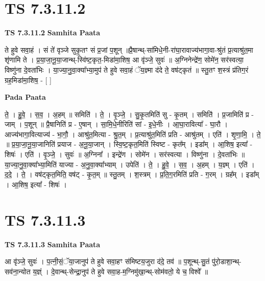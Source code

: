 \documentclass[17pt]{extarticle}
\begin{document}

\section{ TS 7.3.11.2 }

\textbf{TS 7.3.11.2 } \newline
\textbf{Samhita Paata} \newline

ते हुवे सवा॒हं । सं ते॑ वृञ्जे सुकृ॒तꣳ सं प्र॒जां प॒शून् ॥प्रै॒षान्थ्-सा॑मिधे॒नी-रा॑घा॒रावाज्य॑भागा॒वा-श्रु॑तं प्र॒त्याश्रु॑त॒मा शृ॑णामि ते । प्र॒या॒जा॒नू॒या॒जान्थ्-स्वि॑ष्ट॒कृत॒-मिडा॑मा॒शिष॒ आ वृ॑ञ्जे॒ सुवः॑ ॥ अ॒ग्निनेन्द्रे॑ण॒ सोमे॑न॒ सर॑स्वत्या॒ विष्णु॑ना दे॒वता॑भिः । या॒ज्या॒नु॒वा॒क्या᳚भ्या॒मुप॑ ते हुवे सवा॒हं ॅय॒ज्ञ्मा द॑दे ते॒ वष॑ट्कृतं ॥ स्तु॒तꣳ श॒स्त्रं प्र॑तिग॒रं ग्रह॒मिडा॑मा॒शिष॒ - [  ] \newline

\textbf{Pada Paata} \newline

ते॒ । हु॒वे॒ । स॒व॒ । अ॒हम् ॥ समिति॑ । ते॒ । वृ॒ञ्जे॒ । सु॒कृ॒तमिति॑ सु - कृ॒तम् । समिति॑ । प्र॒जामिति॑ प्र - जाम् । प॒शून् ॥ प्रै॒षानिति॑ प्र - ए॒षान् । सा॒मि॒धे॒नीरिति॑ सां - इ॒धे॒नीः । आ॒घा॒रावित्या᳚ - घा॒रौ । आज्य॑भागा॒वित्याज्य॑ - भा॒गौ॒ । आश्रु॑त॒मित्या - श्रु॒त॒म् । प्र॒त्याश्रु॑त॒मिति॑ प्रति - आश्रु॑तम् । एति॑ । शृ॒णा॒मि॒ । ते॒ ॥ प्र॒या॒जा॒नू॒या॒जानिति॑ प्रयाज - अ॒नू॒या॒जान् । स्वि॒ष्ट॒कृत॒मिति॑ स्विष्ट - कृत᳚म् । इडा᳚म् । आ॒शिष॒ इत्या᳚ - शिषः॑ । एति॑ । वृ॒ञ्जे॒ । सुवः॑ ॥ अ॒ग्निना᳚ । इन्द्रे॑ण । सोमे॑न । सर॑स्वत्या । विष्णु॑ना । दे॒वता॑भिः ॥ या॒ज्या॒नु॒वा॒क्या᳚भ्या॒मिति॑ याज्या - अ॒नु॒वा॒क्या᳚भ्याम् । उपेति॑ । ते॒ । हु॒वे॒ । स॒व॒ । अ॒हम् । य॒ज्ञ्म् । एति॑ । द॒दे॒ । ते॒ । वष॑ट्कृत॒मिति॒ वष॑ट् - कृ॒त॒म् ॥ स्तु॒तम् । श॒स्त्रम् । प्र॒ति॒ग॒रमिति॑ प्रति - ग॒रम् । ग्रह᳚म् । इडा᳚म् । आ॒शिष॒ इत्या᳚ - शिषः॑ ।  \newline





\section{ TS 7.3.11.3 }

\textbf{TS 7.3.11.3 } \newline
\textbf{Samhita Paata} \newline

आ वृ॑ञ्जे॒ सुवः॑ । प॒त्नी॒सं॒ॅया॒जानुप॑ ते हुवे सवा॒हꣳ स॑मिष्टय॒जुरा द॑दे॒ तव॑ ॥ प॒शून्थ्-सु॒तं पु॑रो॒डाशा॒न्थ्-सव॑ना॒न्योत य॒ज्ञ्ं । दे॒वान्थ्-सेन्द्रा॒नुप॑ ते हुवे सवा॒ह-म॒ग्निमु॑खा॒न्थ्-सोम॑वतो॒ ये च॒ विश्वे᳚ ॥ \newline
\end{document}
